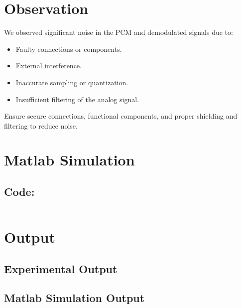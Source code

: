 \documentclass[12pt]{article}
\begin{document}
\section*{Observation}
We observed significant noise in the PCM and demodulated signals due to:

\begin{itemize}
    \item Faulty connections or components.
    \item External interference.
    \item Inaccurate sampling or quantization.
    \item Insufficient filtering of the analog signal.
\end{itemize}

Ensure secure connections, functional components, and proper shielding and filtering to reduce noise.


\section*{Matlab Simulation}

\subsection*{Code:}

\inputminted[linenos,breaklines,breakanywhere]{matlab}{./assets/pcm.m}

\section*{Output}

\subsection*{Experimental Output}


\subsection*{Matlab Simulation Output}

\end{document}
